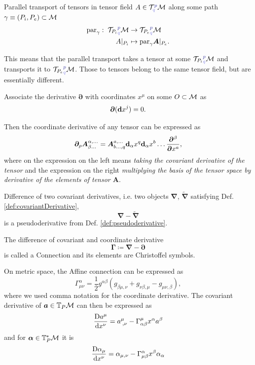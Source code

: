 \begin{definition}
    Parallel transport of tensors in tensor field $A\in \TT^{\bluee p}_{\blueee q} \M$ along some path $\gamma\equiv  (P_i,P_e)\subset \mathcal{M}$ 
    \begin{align*}
        \Par_\gamma:\; {\TT _{P_i}}^{\bluee p}_{\blueee q}\M&\rightarrow {\TT_{P_e}}^{\bluee p}_{\blueee q}\M\\
        A|_{P_i} &\mapsto \Par_\gamma \bm A|_{P_e}.
    \end{align*}
\end{definition}
This means that the parallel transport takes a tensor at some ${\TT_{P_i}}^{\bluee p}_{\blueee q} \M$ and transports it to ${\TT_{P_e}}^{\bluee p}_{\blueee q} \M$.  Those to tensors belong to the same tensor field, but are essentially different.

\begin{definition}
    Associate the derivative $\bm \partial$ with coordinates $x^\mu$ on some $O\subset\mathcal{M}$ as
    $$\bm \partial (\bm {\mathrm{d}} x^j)=0.$$
\end{definition}
Then the coordinate derivative of any tensor can be expressed as
\begin{equation}
    \bm \partial_\rho \bm A^{\alpha,\dots}_{\beta\dots} = \bm A^{a,\dots}_{b\dots,q}\bm {\mathrm{d}}_\alpha x^q \bm {\mathrm{d}}_\alpha x^b  \dots \frac{\bm \partial^\beta}{\bm \partial x^a},
\end{equation}
where on the expression on the left means \emph{taking the covariant derivative of the tensor} and the expression on the right \emph{multiplying the basis of the tensor space by derivative of the elements of tensor $\bm A$}.
\begin{thm}
     Difference of two covariant derivatives, i.e. two objects $\bm \nabla$, $\bm{\tilde\nabla}$ satisfying Def. \ref{def:covariantDerivative},
      $$\bm\nabla-\bm{\tilde\nabla}$$
    is a pseudoderivative from Def. \ref{def:pseudoderivative}.
\end{thm}

\begin{definition}
    The difference of covariant and coordinate derivative
    $$\bm \Gamma\coloneqq \bm\nabla-\bm\partial$$
    is called a Connection and its elements are Christoffel symbols.
\end{definition}
On metric space, the Affine connection can be expressed as
\begin{equation}
    \Gamma^{\alpha}_{\mu\nu} = \frac{1}{2}g^{\alpha \beta}\left(g_{\beta\mu,\nu}+g_{\nu\beta,\mu}-g_{\mu\nu,\beta}\right),
\end{equation}
where we used comma notation for the coordinate derivative.
The covariant derivative of $\bm a\in \mathbb{T}_P\mathcal{M}$ can then be expressed as
\begin{equation}
    \frac{\mathrm{D} a^\mu}{\mathrm{d} x^\nu}=a_{\;,\nu}^\mu-\Gamma^\mu_{\alpha\beta} x^\alpha a^\beta 
\end{equation}
and for $\bm\alpha\in \mathbb{T}_P^*\mathcal{M}$ it is
\begin{equation}
    \frac{\mathrm{D} \alpha_\mu}{\mathrm{d} x^\nu}=\alpha_{\mu,\nu}-\Gamma^\alpha_{\mu\beta}x^\beta \alpha_\alpha 
\end{equation}


